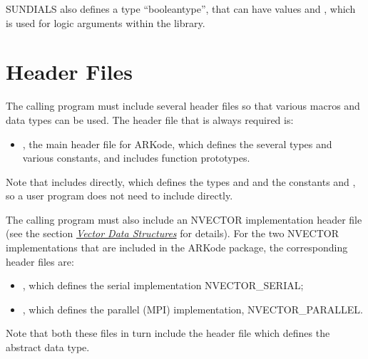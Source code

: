 \documentclass[letterpaper,10pt,english]{sphinxmanual}
\begin{document}
SUNDIALS also defines a type ``booleantype'', that can have
values  and , which is used for logic arguments
within the library.


\section{Header Files}
\label{c_interface/General:header-files}
The calling program must include several header files so that various
macros and data types can be used. The header file that is always
required is:
\begin{itemize}
\item {} 
, the main header file for ARKode, which defines the
several types and various constants, and includes function
prototypes.

\end{itemize}

Note that  includes  directly, which
defines the types  and  and the
constants  and , so a user program does not need to
include  directly.

The calling program must also include an NVECTOR implementation
header file (see the section {\hyperref[nvectors/index:nvectors]{\emph{Vector Data Structures}}} for details).  For the two
NVECTOR implementations that are included in the ARKode package, the
corresponding header files are:
\begin{itemize}
\item {} 
, which defines the serial implementation
NVECTOR\_SERIAL;

\item {} 
, which defines the parallel (MPI)
implementation, NVECTOR\_PARALLEL.

\end{itemize}

Note that both these files in turn include the header file
 which defines the abstract  data
type.
\end{document}
